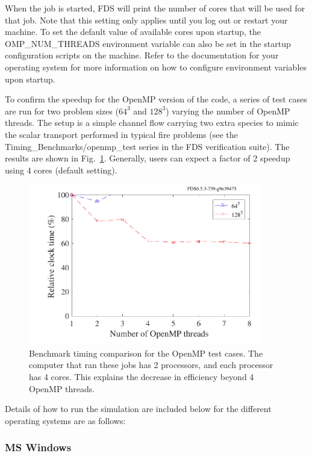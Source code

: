 \documentclass[11pt]{book}
\begin{document}
When the job is started, FDS will print the number of cores that will be used for that job. Note that this setting only applies until you log out or restart your machine. To set the default value of available cores upon startup, the {\ct OMP\_NUM\_THREADS} environment variable can also be set in the startup configuration scripts on the machine. Refer to the documentation for your operating system for more information on how to configure environment variables upon startup.

To confirm the speedup for the OpenMP version of the code, a series of test cases are run for two problem sizes ($64^3$ and $128^3$) varying the number of OpenMP threads.  The setup is a simple channel flow carrying two extra species to mimic the scalar transport performed in typical fire problems (see the {\ct Timing\_Benchmarks/openmp\_test} series in the FDS verification suite).  The results are shown in Fig.~\ref{fig:openmp_timing_benchmarks}.  Generally, users can expect a factor of 2 speedup using 4 cores (default setting).

\begin{figure}[ht!]
\centering
\includegraphics[width=4.0in]{SCRIPT_FIGURES/openmp_timing_benchmarks}
\caption[OpenMP timing study]{Benchmark timing comparison for the OpenMP test cases. The computer that ran these jobs has 2 processors, and each processor has 4 cores. This explains the decrease in efficiency beyond 4 OpenMP threads.}
\label{fig:openmp_timing_benchmarks}
\end{figure}
Details of how to run the simulation are included below for the different operating systems are as follows:

\subsubsection{MS Windows}
\end{document}
